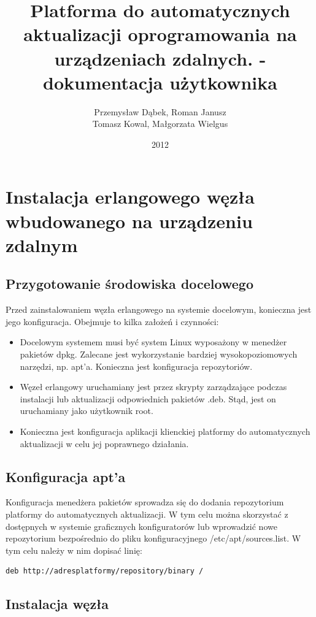 \documentclass[polish,12pt]{aghthesis}
\author{Przemysław Dąbek, Roman Janusz\\ Tomasz Kowal, Małgorzata Wielgus}
\title{Platforma do automatycznych aktualizacji oprogramowania na urządzeniach zdalnych. - dokumentacja użytkownika}
\date{2012}
\begin{document}
\maketitle

\section{Instalacja erlangowego węzła wbudowanego na urządzeniu zdalnym}

\subsection{Przygotowanie środowiska docelowego}

Przed zainstalowaniem węzła erlangowego na systemie docelowym, konieczna jest jego konfiguracja. Obejmuje to kilka założeń i czynności:
\begin{itemize}
\item Docelowym systemem musi być system Linux wyposażony w menedżer pakietów dpkg. Zalecane jest wykorzystanie bardziej wysokopoziomowych narzędzi, np. apt'a. Konieczna jest konfiguracja repozytoriów.
\item Węzeł erlangowy uruchamiany jest przez skrypty zarządzające podczas instalacji lub aktualizacji odpowiednich pakietów .deb. Stąd, jest on uruchamiany jako użytkownik root.
\item Konieczna jest konfiguracja aplikacji klienckiej platformy do automatycznych aktualizacji w celu jej poprawnego działania.
\end{itemize}

\subsection{Konfiguracja apt'a}

Konfiguracja menedżera pakietów sprowadza się do dodania repozytorium platformy do automatycznych aktualizacji. W tym celu można skorzystać z dostępnych w systemie graficznych konfiguratorów lub wprowadzić nowe repozytorium bezpośrednio do pliku konfiguracyjnego /etc/apt/sources.list. W tym celu należy w nim dopisać linię:

\begin{lstlisting}
deb http://adresplatformy/repository/binary /
\end{lstlisting}

\subsection{Instalacja węzła}
\end{document}
